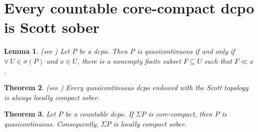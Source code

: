 \documentclass[preprint,12pt]{elsarticle}
\numberwithin{equation}{section}
\newtheorem{theorem}{Theorem}[section]
\newtheorem{lemma}[theorem]{Lemma}
\begin{document}
\section{Every countable core-compact dcpo is Scott sober}
\begin{lemma} {\rm(see \cite{GG03}) Let $P$ be a dcpo. Then $P$ is quasicontinuous if and only if $\forall\ U\in\sigma(P)$ and $x\in U$, there is a nonempty finite subset $F\subseteq U$ such that $F\ll x$.}

\end{lemma}



\begin{theorem} {\rm(see \cite{GG03}) Every quasicontinuous dcpo endowed with the Scott topology is always locally compact sober.}
\end{theorem}


\begin{theorem}
{\rm Let $P$ be a countable dcpo. If
$\Sigma P$ is core-compact, then $P$ is
quasicontinuous. Consequently, $\Sigma P$ is locally compact
sober.}
\end{theorem}
\end{document}
